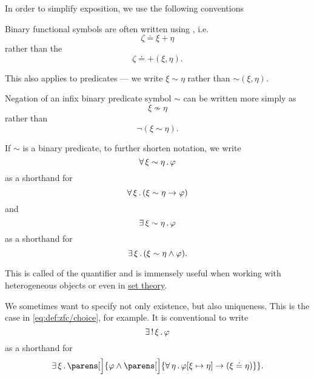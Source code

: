 \begin{remark}\label{rem:first_order_formula_conventions}
  In order to simplify exposition, we use the following conventions
  \begin{thmenum}
     Binary functional symbols are often written using , i.e.
    \begin{equation*}
      \zeta \doteq \xi + \eta
    \end{equation*}
    rather than the 
    \begin{equation*}
      \zeta \doteq +(\xi, \eta).
    \end{equation*}

    This also applies to predicates --- we write \( \xi \sim \eta \) rather than \( \sim(\xi, \eta) \).

     Negation of an infix binary predicate symbol \( \sim \) can be written more simply as
    \begin{equation*}
      \xi \not\sim \eta
    \end{equation*}
    rather than
    \begin{equation*}
      \neg(\xi \sim \eta).
    \end{equation*}

     If \( \sim \) is a binary predicate, to further shorten notation, we write
    \begin{equation*}
      \forall \thinspace \xi \sim \eta \thinspace . \thinspace \varphi
    \end{equation*}
    as a shorthand for
    \begin{equation*}
      \forall \thinspace \xi \thinspace . \thinspace (\xi \sim \eta \rightarrow \varphi)
    \end{equation*}
    and
    \begin{equation*}
      \exists \thinspace \xi \sim \eta \thinspace . \thinspace \varphi
    \end{equation*}
    as a shorthand for
    \begin{equation*}
      \exists \thinspace \xi \thinspace . \thinspace (\xi \sim \eta \wedge \varphi).
    \end{equation*}

    This is called  of the quantifier and is immensely useful when working with heterogeneous objects or even in \hyperref[sec:set_theory]{set theory}.

     We sometimes want to specify not only existence, but also uniqueness. This is the case in \eqref{eq:def:zfc/choice}, for example. It is conventional to write
    \begin{equation*}
      \exists \thinspace ! \thinspace \xi \thinspace . \thinspace \varphi
    \end{equation*}
    as a shorthand for
    \begin{equation*}
      \qexists \xi \parens[\Big]{ \varphi \wedge \parens[\Big]{ \qforall \eta \varphi[\xi \mapsto \eta] \rightarrow (\xi \doteq \eta) } }.
    \end{equation*}


\end{thmenum}
\end{remark}
